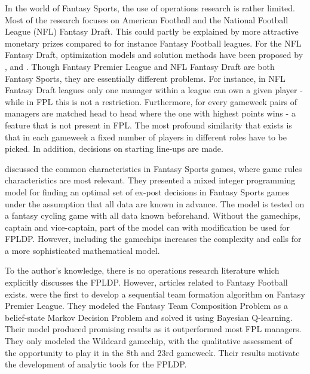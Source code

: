 \newpar

In the world of Fantasy Sports, the use of operations research is rather limited. Most of the research focuses on American Football and the National Football League (NFL) Fantasy Draft. This could partly be explained by more attractive monetary prizes compared to for instance Fantasy Football leagues. For the NFL Fantasy Draft, optimization models and solution methods have been proposed by \cite{Fry}, \cite{Gibson} and \cite{Becker}. Though Fantasy Premier League and NFL Fantasy Draft are both Fantasy Sports, they are essentially different problems. For instance, in NFL Fantasy Draft leagues only one manager within a league can own a given player - while in FPL this is not a restriction. Furthermore, for every gameweek pairs of managers are matched head to head where the one with highest points wins - a feature that is not present in FPL. The most profound similarity that exists is that in each gameweek a fixed number of players in different roles have to be picked. In addition, decisions on starting line-ups are made.

\newpar

\cite{Mathsports} discussed the common characteristics in Fantasy Sports games, where game rules characteristics are most relevant. They presented a mixed integer programming model for finding an optimal set of ex-post decisions in Fantasy Sports games under the assumption that all data are known in advance. The model is tested on a fantasy cycling game with all data known beforehand. Without the gamechips, captain and vice-captain, part of the model can with modification be used for FPLDP. However, including the gamechips increases the complexity and calls for a more sophisticated mathematical model.

\newpar

To the author's knowledge, there is no operations research literature which explicitly discusses the FPLDP. However, articles related to Fantasy Football exists. \cite{Matthews} were the first to develop a sequential team formation algorithm on Fantasy Premier League. They modeled the Fantasy Team Composition Problem as a belief-state Markov Decision Problem and solved it using Bayesian Q-learning. Their model produced promising results as it outperformed most FPL managers. They only modeled the Wildcard gamechip, with the qualitative assessment of the opportunity to play it in the 8th and 23rd gameweek. Their results motivate the development of analytic tools for the FPLDP.

\newpar


